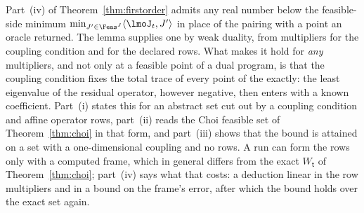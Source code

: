 
Part~(iv) of Theorem~\ref{thm:firstorder} admits any real number below the
feasible-side minimum $\min_{J'\in\Feas^{J}}\langle\lmoJ_t,J'\rangle$ in
place of the pairing with a point an oracle returned. The lemma supplies one
by weak duality, from multipliers for the coupling condition and for the
declared rows. What makes it hold for \emph{any} multipliers, and not only at
a feasible point of a dual program, is that the coupling condition fixes the
total trace of every point of the  exactly: the least
eigenvalue of the residual operator, however negative, then enters with a
known coefficient. Part~(i) states this for an abstract set cut out by a
coupling condition and affine operator rows, part~(ii) reads the Choi
feasible set of Theorem~\ref{thm:choi} in that form, and part~(iii) shows
that the bound is attained on a set with a one-dimensional coupling and no
rows. A run can form the rows only with a computed frame, which in general
differs from the exact $W_{\mathsf t}$ of Theorem~\ref{thm:choi}; part~(iv)
says what that costs: a deduction linear in the row multipliers and in a
bound on the frame's error, after which the bound holds over the exact set
again.


